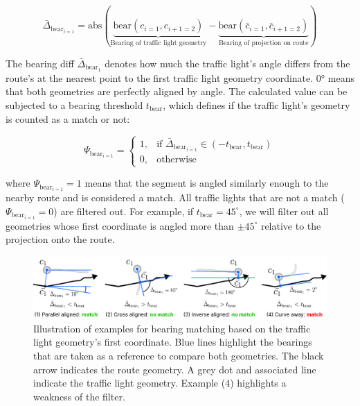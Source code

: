\begin{equation}
    \bar{\Delta}_{\text{bear}_{i=1}} = 
        \text{abs}(\underbrace{\text{bear}(c_{i=1}, c_{i+1=2})}_{\text{Bearing of traffic light geometry}} - \underbrace{\text{bear}(\bar{c}_{i=1}, \bar{c}_{i+1=2})}_{\text{Bearing of projection on route}})
\end{equation}

The bearing diff $\bar{\Delta}_{\text{bear}_1}$ denotes how much the traffic light's angle differs from the route's at the nearest point to the first traffic light geometry coordinate. 0° means that both geometries are perfectly aligned by angle. The calculated value can be subjected to a bearing threshold $t_{\text{bear}}$, which defines if the traffic light's geometry is counted as a match or not:

\begin{equation}
\Psi_{\text{bear}_{i=1}} = 
    \begin{cases}
            1,& \text{if } \bar{\Delta}_{\text{bear}_{i=1}} \in \left(-t_{\text{bear}}, t_{\text{bear}}\right)\\
            0,              & \text{otherwise}
        \end{cases}
\end{equation}

where $\Psi_{\text{bear}_{i=1}} = 1$ means that the segment is angled similarly enough to the nearby route and is considered a match. All traffic lights that are not a match ($\Psi_{\text{bear}_{i=1}} = 0$) are filtered out. For example, if $t_{\text{bear}} = 45^{\circ}$, we will filter out all geometries whose first coordinate is angled more than $\pm 45^{\circ}$ relative to the projection onto the route. 

\begin{figure}[t]
\centering
\includegraphics[width=\linewidth]{images/sg-selection-bearing-filter.pdf}
\caption{Illustration of examples for bearing matching based on the traffic light geometry's first coordinate. Blue lines highlight the bearings that are taken as a reference to compare both geometries. The black arrow indicates the route geometry. A grey dot and associated line indicate the traffic light geometry. Example (4) highlights a weakness of the filter.}
\label{fig:sg-selection-bearing-filter}
\end{figure}

